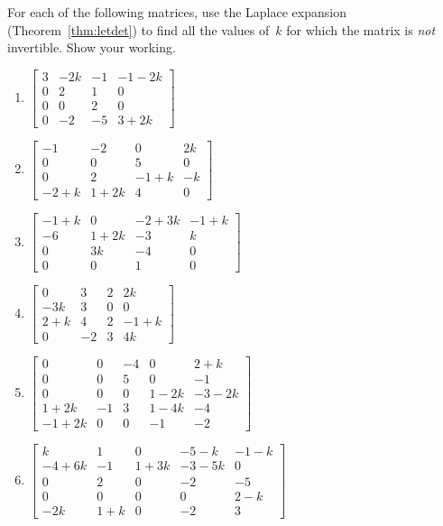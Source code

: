 \begin{exercise} \label{ex:} 
For each of the following matrices, use the Laplace expansion (Theorem~\ref{thm:letdet}) to find all the values of~\(k\) for which the matrix is \emph{not} invertible.
Show your working.

\begin{enumerate}
\item \(\begin{bmatrix} 3 & -2k & -1 & -1-2k
\\0 & 2 & 1 & 0
\\0 & 0 & 2 & 0
\\0 & -2 & -5 & 3+2k \end{bmatrix}\)

\item \(\begin{bmatrix} -1 & -2 & 0 & 2k
\\0 & 0 & 5 & 0
\\0 & 2 & -1+k & -k
\\-2+k & 1+2k & 4 & 0 \end{bmatrix}\)

\item \(\begin{bmatrix} -1+k & 0 & -2+3k & -1+k
\\-6 & 1+2k & -3 & k
\\0 & 3k & -4 & 0
\\0 & 0 & 1 & 0 \end{bmatrix}\)

\item \(\begin{bmatrix} 0 & 3 & 2 & 2k
\\-3k & 3 & 0 & 0
\\2+k & 4 & 2 & -1+k
\\0 & -2 & 3 & 4k \end{bmatrix}\)

\item \(\begin{bmatrix} 0 & 0 & -4 & 0 & 2+k
\\0 & 0 & 5 & 0 & -1
\\0 & 0 & 0 & 1-2k & -3-2k
\\1+2k & -1 & 3 & 1-4k & -4
\\-1+2k & 0 & 0 & -1 & -2 \end{bmatrix}\)

\item \(\begin{bmatrix} k & 1 & 0 & -5-k & -1-k
\\-4+6k & -1 & 1+3k & -3-5k & 0
\\0 & 2 & 0 & -2 & -5
\\0 & 0 & 0 & 0 & 2-k
\\-2k & 1+k & 0 & -2 & 3 \end{bmatrix}\)

\end{enumerate}
\end{exercise}
